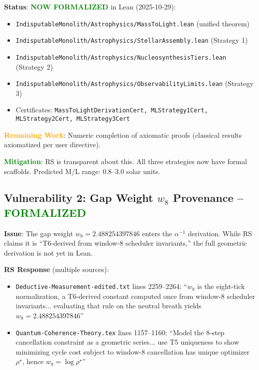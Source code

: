 \documentclass[11pt]{article}
\begin{document}
\textbf{Status}: \textcolor{green}{\textbf{NOW FORMALIZED}} in Lean (2025-10-29):
\begin{itemize}
\item \texttt{IndisputableMonolith/Astrophysics/MassToLight.lean} (unified theorem)
\item \texttt{IndisputableMonolith/Astrophysics/StellarAssembly.lean} (Strategy 1)
\item \texttt{IndisputableMonolith/Astrophysics/NucleosynthesisTiers.lean} (Strategy 2)
\item \texttt{IndisputableMonolith/Astrophysics/ObservabilityLimits.lean} (Strategy 3)
\item Certificates: \texttt{MassToLightDerivationCert, MLStrategy1Cert, MLStrategy2Cert, MLStrategy3Cert}
\end{itemize}

\noindent\textcolor{orange}{\textbf{Remaining Work}}: Numeric completion of axiomatic proofs (classical results axiomatized per user directive).

\noindent\textcolor{green}{\textbf{Mitigation}}: RS is transparent about this. All three strategies now have formal scaffolds. Predicted M/L range: 0.8--3.0 solar units.

\subsection{Vulnerability 2: Gap Weight $w_8$ Provenance -- \textcolor{green}{FORMALIZED}}

\textbf{Issue}: The gap weight $w_8=2.488254397846$ enters the $\alpha^{-1}$ derivation. While RS claims it is ``T6-derived from window-8 scheduler invariants,'' the full geometric derivation is not yet in Lean.

\textbf{RS Response} (multiple sources):
\begin{itemize}
\item \texttt{Deductive-Measurement-edited.txt} lines 2259--2264: ``$w_8$ is the eight-tick normalization, a T6-derived constant computed once from window-8 scheduler invariants... evaluating that rule on the neutral breath yields $w_8=2.488254397846$''
\item \texttt{Quantum-Coherence-Theory.tex} lines 1157--1160: ``Model the 8-step cancellation constraint as a geometric series... use T5 uniqueness to show minimizing cycle cost subject to window-8 cancellation has unique optimizer $\rho^\star$, hence $w_8=\log\rho^\star$''
\end{itemize}
\end{document}
